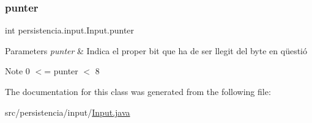 \subsubsection{\texorpdfstring{punter}{punter}}
{\footnotesize\ttfamily int persistencia.\+input.\+Input.\+punter\hspace{0.3cm}{\ttfamily [private]}}


\begin{DoxyParams}{Parameters}
{\em punter} & Indica el proper bit que ha de ser llegit del byte en qüestió \\
\hline
\end{DoxyParams}
\begin{DoxyNote}{Note}
0 $<$= punter $<$ 8 
\end{DoxyNote}


The documentation for this class was generated from the following file\+:\begin{DoxyCompactItemize}
\item 
src/persistencia/input/\hyperlink{Input_8java}{Input.\+java}\end{DoxyCompactItemize}
